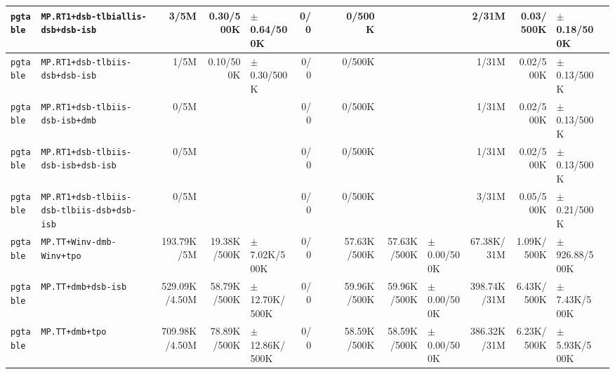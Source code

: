 \begin{tabular}{l l  | r r l | r r l | r r l | r r l l}
        \verb|pgtable| &                    \verb|MP.RT1+dsb-tlbiallis-dsb+dsb-isb| &           3/5M &             0.30/500K &   $\pm$ 0.64/500K &            0/0 &                       &  &         0/500K &                       &                   &          2/31M &             0.03/500K &   $\pm$ 0.18/500K & \\ \hline 
        \verb|pgtable| &                       \verb|MP.RT1+dsb-tlbiis-dsb+dsb-isb| &           1/5M &             0.10/500K &   $\pm$ 0.30/500K &            0/0 &                       &  &         0/500K &                       &                   &          1/31M &             0.02/500K &   $\pm$ 0.13/500K & \\ \hline 
        \verb|pgtable| &                       \verb|MP.RT1+dsb-tlbiis-dsb-isb+dmb| &           0/5M &                       &                   &            0/0 &                       &  &         0/500K &                       &                   &          1/31M &             0.02/500K &   $\pm$ 0.13/500K & \\ \hline 
        \verb|pgtable| &                   \verb|MP.RT1+dsb-tlbiis-dsb-isb+dsb-isb| &           0/5M &                       &                   &            0/0 &                       &  &         0/500K &                       &                   &          1/31M &             0.02/500K &   $\pm$ 0.13/500K & \\ \hline 
        \verb|pgtable| &            \verb|MP.RT1+dsb-tlbiis-dsb-tlbiis-dsb+dsb-isb| &           0/5M &                       &                   &            0/0 &                       &  &         0/500K &                       &                   &          3/31M &             0.05/500K &   $\pm$ 0.21/500K & \\ \hline 
        \verb|pgtable| &                             \verb|MP.TT+Winv-dmb-Winv+tpo| &     193.79K/5M &           19.38K/500K &  $\pm$ 7.02K/500K &            0/0 &                       &  &    57.63K/500K &           57.63K/500K &   $\pm$ 0.00/500K &     67.38K/31M &            1.09K/500K & $\pm$ 926.88/500K & \\ \hline 
        \verb|pgtable| &                                   \verb|MP.TT+dmb+dsb-isb| &  529.09K/4.50M &           58.79K/500K & $\pm$ 12.70K/500K &            0/0 &                       &  &    59.96K/500K &           59.96K/500K &   $\pm$ 0.00/500K &    398.74K/31M &            6.43K/500K &  $\pm$ 7.43K/500K & \\ \hline 
        \verb|pgtable| &                                       \verb|MP.TT+dmb+tpo| &  709.98K/4.50M &           78.89K/500K & $\pm$ 12.86K/500K &            0/0 &                       &  &    58.59K/500K &           58.59K/500K &   $\pm$ 0.00/500K &    386.32K/31M &            6.23K/500K &  $\pm$ 5.93K/500K & \\ \hline 

\end{tabular}
